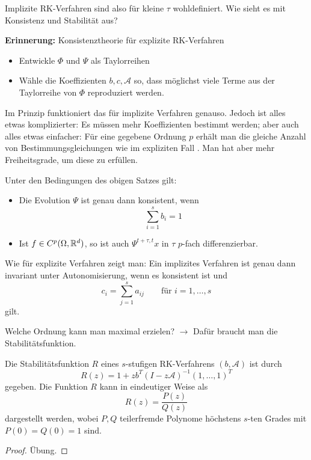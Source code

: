 Implizite RK-Verfahren sind also für kleine $\tau$ wohldefiniert.
Wie sieht es mit Konsistenz und Stabilität aus?

\textbf{Erinnerung:} Konsistenztheorie für explizite RK-Verfahren
\begin{itemize}
	\item Entwickle $\Phi$ und $\Psi$ als Taylorreihen
	\item Wähle die Koeffizienten $b,c, \mathcal A$ so, dass möglichst viele Terme aus der Taylorreihe von $\Phi$  reproduziert werden.
\end{itemize}

Im Prinzip funktioniert das für implizite Verfahren genauso. Jedoch ist alles etwas komplizierter: Es müssen mehr Koeffizienten bestimmt werden; aber auch alles etwas einfacher: Für eine gegebene Ordnung $p$ erhält man die gleiche Anzahl von Bestimmungsgleichungen wie im expliziten Fall \cite[Satz~4.24]{deuflhard_bornemann:2008}. Man hat aber mehr Freiheitsgrade, um diese zu erfüllen.

\begin{satz}
	Unter den Bedingungen des obigen Satzes gilt:
	\begin{itemize}
		\item Die Evolution $\Psi$ ist genau dann konsistent, wenn
		\begin{equation*}
			\sum_{i=1}^s b_i = 1
		\end{equation*}
		\item Ist $f \in C^p(\Omega, \mathbb R^d)$, so ist auch $\Psi^{t+\tau, t} x$ in $\tau$ $p$-fach differenzierbar.
	\end{itemize}
\end{satz}

Wie für explizite Verfahren zeigt man: Ein implizites Verfahren ist genau dann invariant unter Autonomisierung, wenn es konsistent ist und
\begin{equation*}
	c_i = \sum_{j=1}^{s} a_{ij} \qquad \text{für } i=1,\dots, s
\end{equation*}
gilt. 

Welche Ordnung kann man maximal erzielen? $\to$ Dafür braucht man die Stabilitätsfunktion.

\begin{lemma} 
	Die Stabilitätsfunktion $R$ eines $s$-stufigen RK-Verfahrens $(b,\mathcal A)$ ist durch
	\begin{equation*}
		R(z) = 1 + zb^T (I - z\mathcal A)^{-1} (1,\dots,1)^T
	\end{equation*}
	gegeben. Die Funktion $R$ kann in eindeutiger Weise als 
	\begin{equation*}
		R(z) = \frac{P(z)}{Q(z)}
	\end{equation*}
	dargestellt werden, wobei $P,Q$ teilerfremde Polynome höchstens $s$-ten Grades mit $P(0) = Q(0) = 1$ sind.
\end{lemma}
\begin{proof}
	Übung.
\end{proof}

